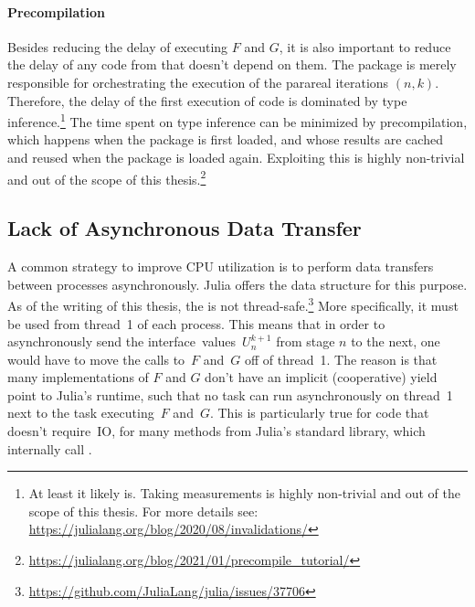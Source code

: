 \paragraph{Precompilation}

Besides reducing the delay of executing $F$ and $G$,
it is also important to reduce the delay of any code from  that doesn't depend on them.
The package is merely responsible for orchestrating the execution of the parareal iterations $(n,k)$.
Therefore, the delay of the first execution of  code is dominated by type inference.\footnote{%
  At least it likely is. Taking measurements is highly non-trivial and out of the scope of this thesis.
  For more details see: \url{https://julialang.org/blog/2020/08/invalidations/}
}
The time spent on type inference can be minimized by precompilation,
which happens when the package is first loaded,
and whose results are cached and reused when the package is loaded again.
Exploiting this is highly non-trivial and out of the scope of this thesis.\footnote{\url{https://julialang.org/blog/2021/01/precompile_tutorial/}}


\subsection{Lack of Asynchronous Data Transfer}

A common strategy to improve CPU utilization is to perform data transfers between processes asynchronously.
Julia offers the  data structure for this purpose.
As of the writing of this thesis,
the  is not thread-safe.\footnote{\url{https://github.com/JuliaLang/julia/issues/37706}}
More specifically, it must be used from thread~1 of each process.
This means that in order to asynchronously send the interface~values~$U_n^{k+1}$ from stage $n$ to the next,
one would have to move the calls to~$F$ and~$G$ off of thread~1.
The reason is that many implementations of $F$ and $G$ don't have an implicit (cooperative) yield point to Julia's runtime,
such that no task can run asynchronously on thread~1 next to the task executing~$F$ and~$G$.
This is particularly true for code that doesn't require~\ac{IO},
\eg for many methods from Julia's  standard library,
which internally call .

